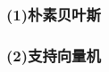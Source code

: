 \documentclass[cs4size,a4paper]{ctexart}
\DeclareMathOperator*{\argmax}{arg\,max}
\numberwithin{equation}{section}
\numberwithin{table}{section}
\numberwithin{figure}{section}
\begin{document}

\subsubsection*{(1)朴素贝叶斯}




\subsubsection*{(2)支持向量机}

\end{document}
